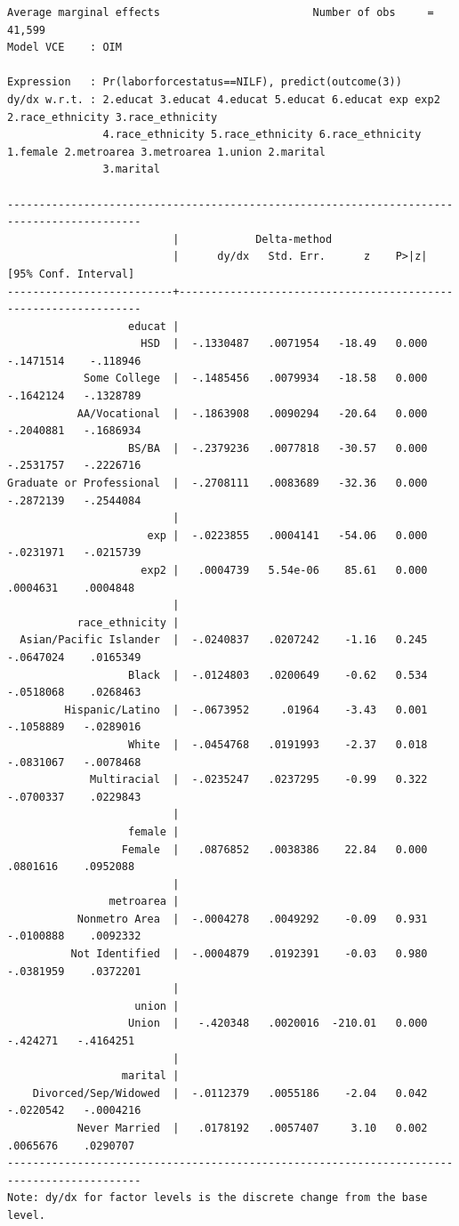 \documentclass[
]{book}
\begin{document}
\begin{verbatim}
Average marginal effects                        Number of obs     =     41,599
Model VCE    : OIM

Expression   : Pr(laborforcestatus==NILF), predict(outcome(3))
dy/dx w.r.t. : 2.educat 3.educat 4.educat 5.educat 6.educat exp exp2 2.race_ethnicity 3.race_ethnicity
               4.race_ethnicity 5.race_ethnicity 6.race_ethnicity 1.female 2.metroarea 3.metroarea 1.union 2.marital
               3.marital

-------------------------------------------------------------------------------------------
                          |            Delta-method
                          |      dy/dx   Std. Err.      z    P>|z|     [95% Conf. Interval]
--------------------------+----------------------------------------------------------------
                   educat |
                     HSD  |  -.1330487   .0071954   -18.49   0.000    -.1471514    -.118946
            Some College  |  -.1485456   .0079934   -18.58   0.000    -.1642124   -.1328789
           AA/Vocational  |  -.1863908   .0090294   -20.64   0.000    -.2040881   -.1686934
                   BS/BA  |  -.2379236   .0077818   -30.57   0.000    -.2531757   -.2226716
Graduate or Professional  |  -.2708111   .0083689   -32.36   0.000    -.2872139   -.2544084
                          |
                      exp |  -.0223855   .0004141   -54.06   0.000    -.0231971   -.0215739
                     exp2 |   .0004739   5.54e-06    85.61   0.000     .0004631    .0004848
                          |
           race_ethnicity |
  Asian/Pacific Islander  |  -.0240837   .0207242    -1.16   0.245    -.0647024    .0165349
                   Black  |  -.0124803   .0200649    -0.62   0.534    -.0518068    .0268463
         Hispanic/Latino  |  -.0673952     .01964    -3.43   0.001    -.1058889   -.0289016
                   White  |  -.0454768   .0191993    -2.37   0.018    -.0831067   -.0078468
             Multiracial  |  -.0235247   .0237295    -0.99   0.322    -.0700337    .0229843
                          |
                   female |
                  Female  |   .0876852   .0038386    22.84   0.000     .0801616    .0952088
                          |
                metroarea |
           Nonmetro Area  |  -.0004278   .0049292    -0.09   0.931    -.0100888    .0092332
          Not Identified  |  -.0004879   .0192391    -0.03   0.980    -.0381959    .0372201
                          |
                    union |
                   Union  |   -.420348   .0020016  -210.01   0.000     -.424271   -.4164251
                          |
                  marital |
    Divorced/Sep/Widowed  |  -.0112379   .0055186    -2.04   0.042    -.0220542   -.0004216
           Never Married  |   .0178192   .0057407     3.10   0.002     .0065676    .0290707
-------------------------------------------------------------------------------------------
Note: dy/dx for factor levels is the discrete change from the base level.
\end{verbatim}
\end{document}
